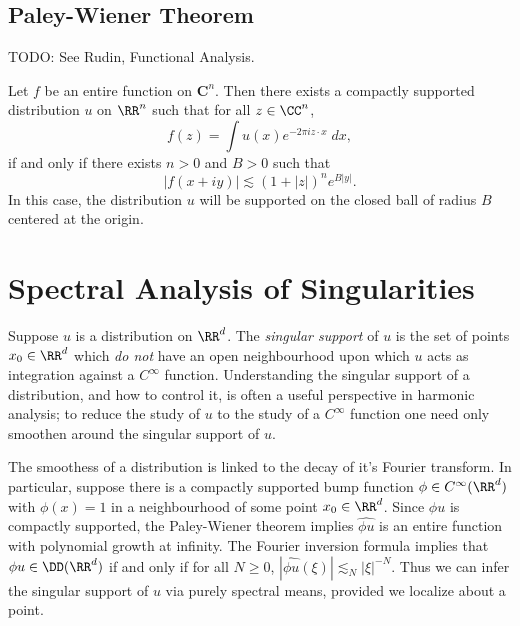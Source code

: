 \section{Paley-Wiener Theorem}

TODO: See Rudin, Functional Analysis.

\begin{theorem}
    Let $f$ be an entire function on $\mathbf{C}^n$. Then there exists a compactly supported distribution $u$ on $\RR^n$ such that for all $z \in \CC^n$,
    \[ f(z) = \int u(x) e^{-2 \pi i z \cdot x}\; dx, \]
    if and only if there exists $n > 0$ and $B > 0$ such that
    \[ |f(x + i y)| \lesssim (1 + |z|)^n e^{B|y|}. \]
    In this case, the distribution $u$ will be supported on the closed ball of radius $B$ centered at the origin.
\end{theorem}







\chapter{Spectral Analysis of Singularities}

Suppose $u$ is a distribution on $\RR^d$. The \emph{singular support} of $u$ is the set of points $x_0 \in \RR^d$ which \emph{do not} have an open neighbourhood upon which $u$ acts as integration against a $C^\infty$ function. Understanding the singular support of a distribution, and how to control it, is often a useful perspective in harmonic analysis; to reduce the study of $u$ to the study of a $C^\infty$ function one need only smoothen around the singular support of $u$.

The smoothess of a distribution is linked to the decay of it's Fourier transform. In particular, suppose there is a compactly supported bump function $\phi \in C^\infty(\RR^d)$ with $\phi(x) = 1$ in a neighbourhood of some point $x_0 \in \RR^d$. Since $\phi u$ is compactly supported, the Paley-Wiener theorem implies $\widehat{\phi u}$ is an entire function with polynomial growth at infinity. The Fourier inversion formula implies that $\phi u \in \DD(\RR^d)$ if and only if for all $N \geq 0$, $|\widehat{\phi u}(\xi)| \lesssim_N |\xi|^{-N}$. Thus we can infer the singular support of $u$ via purely spectral means, provided we localize about a point.

